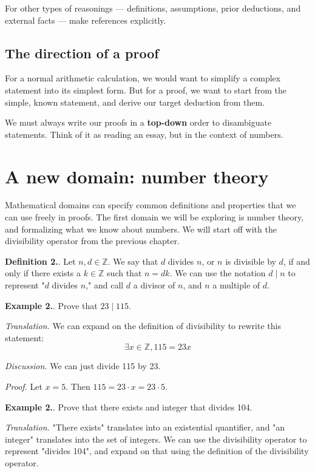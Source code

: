 \documentclass{article}
\newcounter{defcount}
\newcounter{excount}
\newcommand\df{\stepcounter{defcount} \textbf{Definition 2.\thedefcount}. }
\newcommand\ex{\stepcounter{excount} \textbf{Example 2.\theexcount}. }
\begin{document}
For other types of reasonings --- definitions, assumptions, prior deductions, 
and external facts --- make references explicitly.

\newpage
\subsection{The direction of a proof}
For a normal arithmetic calculation, we would want to simplify a complex 
statement into its simplest form. But for a proof, we want to start from the 
simple, known statement, and derive our target deduction from them. 

We must always write our proofs in a \textbf{top-down} order to disambiguate 
statements. Think of it as reading an essay, but in the context of numbers. 

\section{A new domain: number theory}
Mathematical domains can specify common definitions and properties that 
we can use freely in proofs. The first domain we will be exploring is 
number theory, and formalizing what we know about numbers. We will start off 
with the divisibility operator from the previous chapter. 

\df Let $n, d \in \mathbb{Z}$. We say that $d$ divides $n$, or $n$ is 
divisible by $d$, if and only if there exists a $k \in \mathbb{Z}$ such 
that $n = dk$. We can use the notation $d \mid n$ to represent "$d$ divides 
$n$," and call $d$ a divisor of $n$, and $n$ a multiple of $d$.

\ex Prove that $23 \mid 115$.

\textit{Translation.} We can expand on the definition of divisibility to 
rewrite this statement:
$$\exists x \in \mathbb{Z}, 115 = 23x$$

\textit{Discussion.} We can just divide 115 by 23.

\textit{Proof.} Let $x = 5$. Then $115 = 23 \cdot x = 23 \cdot 5$.

\ex Prove that there exists and integer that divides 104.

\textit{Translation.} "There exists" translates into an existential quantifier, 
and "an integer" translates into the set of integers. We can use the 
divisibility operator to represent "divides 104", and expand on that using 
the definition of the divisibility operator.
\end{document}

